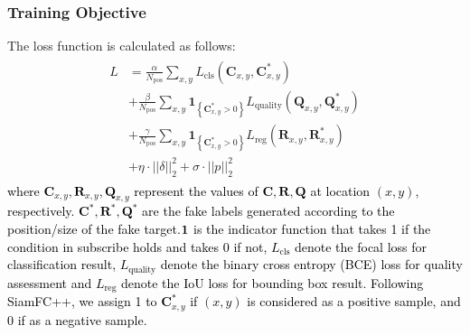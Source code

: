 \documentclass{article}
\begin{document}
\subsubsection{Training Objective}

The loss function is calculated as follows:
\begin{equation}
\begin{array}{l}
\begin{aligned}
L&=\frac{\alpha}{N_{\mathrm{pos}}} \sum_{x, y} L_{\mathrm{cls}}\left(\textbf{C}_{x, y}, \textbf{C}_{x, y}^{*}\right) \\
&+\frac{\beta}{N_{\mathrm{pos}}} \sum_{x, y} \textbf{1}_{\left\{\textbf{C}_{x, y}^{*}>0\right\}} L_{\mathrm{quality}}\left(\textbf{Q}_{x, y}, \textbf{Q}_{x, y}^{*}\right) \\
&+\frac{\gamma}{N_{\mathrm{pos}}} \sum_{x, y} \textbf{1}_{\left\{\textbf{C}_{x, y}^{*}>0\right\}} L_{\mathrm{reg}}\left(\textbf{R}_{x, y}, \textbf{R}_{x, y}^{*}\right) \\
&+\eta \cdot ||\delta||_2^2 +  \sigma \cdot ||p||^2_2
\end{aligned}
\end{array}
\label{eq:loss}
\end{equation}
\textcolor{black} %
{where $\textbf{C}_{x, y}, \textbf{R}_{x, y}, \textbf{Q}_{x, y}$ represent the values of $\textbf{C}, \textbf{R}, \textbf{Q}$ at location $(x, y)$, respectively. $\textbf{C}^*, \textbf{R}^*, \textbf{Q}^*$ are the fake labels generated according to the position/size of the fake target.$\textbf 1$ is the indicator function that takes 1 if the condition in subscribe holds and takes 0 if not, $L_{\mathrm{cls}}$ denote the focal loss \cite{focal} for classification result, $L_{\mathrm{quality}}$ denote the binary cross entropy (BCE) loss for quality assessment and $L_{\mathrm{reg}}$ denote the IoU loss \cite{iou-loss} for bounding box result. Following SiamFC++, we assign 1 to $\textbf{C}_{x, y}^{*}$ if $(x, y)$ is considered as a positive sample, and 0 if as a negative sample.}
\end{document}
